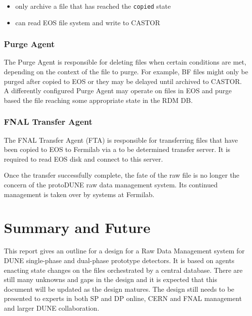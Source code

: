 \documentclass[pdftex,12pt,letter]{article}
\begin{document}
\begin{itemize}
\item only archive a file that has reached the \texttt{copied} state
\item can read EOS file system and write to CASTOR
\end{itemize}

\subsubsection{Purge Agent}

The Purge Agent is responsible for deleting files when certain
conditions are met, depending on the context of the file to purge.
For example, BF files might only be purged after copied to EOS or they
may be delayed until archived to CASTOR.  A differently configured
Purge Agent may operate on files in EOS and purge based the file
reaching some appropriate state in the RDM DB.

\subsubsection{FNAL Transfer Agent}

The FNAL Transfer Agent (FTA) is responsible for transferring files
that have been copied to EOS to Fermilab via a to be determined
transfer server.  It is required to read EOS disk and connect to this
server.  

Once the transfer successfully complete, the fate of the raw file is
no longer the concern of the protoDUNE raw data management system.
Its continued management is taken over by systems at Fermilab.

\section{Summary and Future}

This report gives an outline for a design for a Raw Data Management
system for DUNE single-phase and dual-phase prototype detectors.  It
is based on agents enacting state changes on the files orchestrated by
a central database.  There are still many unknowns and gaps in the
design and it is expected that this document will be updated as the
design matures.  The design still needs to be presented to experts in
both SP and DP online, CERN and FNAL management and larger DUNE
collaboration.
\end{document}
